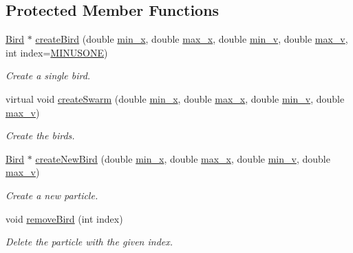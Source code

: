 \subsection*{Protected Member Functions}
\begin{CompactItemize}
\item 
\hyperlink{classBird}{Bird} $\ast$ \hyperlink{classSwarm_96527c398560529a5e3bf7cb4c2f5886}{createBird} (double \hyperlink{classSwarm_b504e23c39413573e3685a88435f5f85}{min\_\-x}, double \hyperlink{classSwarm_e5075d21be96c1cdf441bc2b612177c1}{max\_\-x}, double \hyperlink{classSwarm_160c79397ea811636e17c0e4d6297729}{min\_\-v}, double \hyperlink{classSwarm_2b0dbde2c275f991580a07a745cb5ade}{max\_\-v}, int index=\hyperlink{swarm_8h_364ae2e19d6ffa3e6a93a9971c4595c9}{MINUSONE})
\begin{CompactList}\small\item\em Create a single bird. \item\end{CompactList}\item 
virtual void \hyperlink{classSwarm_1ba247983a6f20d0e835c696748a530b}{createSwarm} (double \hyperlink{classSwarm_b504e23c39413573e3685a88435f5f85}{min\_\-x}, double \hyperlink{classSwarm_e5075d21be96c1cdf441bc2b612177c1}{max\_\-x}, double \hyperlink{classSwarm_160c79397ea811636e17c0e4d6297729}{min\_\-v}, double \hyperlink{classSwarm_2b0dbde2c275f991580a07a745cb5ade}{max\_\-v})
\begin{CompactList}\small\item\em Create the birds. \item\end{CompactList}\item 
\hyperlink{classBird}{Bird} $\ast$ \hyperlink{classSwarm_5371bfef5da1070085c0f98498d01783}{createNewBird} (double \hyperlink{classSwarm_b504e23c39413573e3685a88435f5f85}{min\_\-x}, double \hyperlink{classSwarm_e5075d21be96c1cdf441bc2b612177c1}{max\_\-x}, double \hyperlink{classSwarm_160c79397ea811636e17c0e4d6297729}{min\_\-v}, double \hyperlink{classSwarm_2b0dbde2c275f991580a07a745cb5ade}{max\_\-v})
\begin{CompactList}\small\item\em Create a new particle. \item\end{CompactList}\item 
void \hyperlink{classSwarm_c4550c4e3a04350e6b3d1481b896ee8a}{removeBird} (int index)
\begin{CompactList}\small\item\em Delete the particle with the given index. \item\end{CompactList}\item 

\end{CompactItemize}
